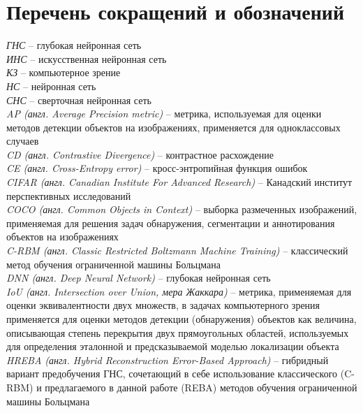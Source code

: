 \chapter*{Перечень сокращений и обозначений}

\noindent\textit{ГНС} -- глубокая нейронная сеть\\
\textit{ИНС} -- искусственная нейронная сеть\\
\textit{КЗ} -- компьютерное зрение\\
\textit{НС} -- нейронная сеть\\
\textit{СНС} -- сверточная нейронная сеть\\
\textit{AP (англ. Average Precision metric)} -- метрика, используемая для оценки методов детекции объектов на изображениях, применяется для одноклассовых случаев\\
\textit{CD (англ. Contrastive Divergence)} -- контрастное расхождение\\
\textit{CE (англ. Cross-Entropy error)} -- кросс-энтропийная функция ошибок\\
\textit{CIFAR (англ. Canadian Institute For Advanced Research)} -- Канадский институт перспективных исследований\\
\textit{COCO (англ. Common Objects in Context)} -- выборка размеченных изображений, применяемая для решения задач обнаружения, сегментации и аннотирования объектов на изображениях\\
\textit{C-RBM (англ. Classic Restricted Boltzmann Machine Training)} -- классический метод обучения ограниченной машины Больцмана\\
\textit{DNN (англ. Deep Neural Network)} -- глубокая нейронная сеть\\
\textit{IoU (англ. Intersection over Union, мера Жаккара)} -- метрика, применяемая для оценки эквивалентности двух множеств, в задачах компьютерного зрения применяется для оценки методов детекции (обнаружения) объектов как величина, описывающая степень перекрытия двух прямоугольных областей, используемых для определения эталонной и предсказываемой моделью локализации объекта \\
\textit{HREBA (англ. Hybrid Reconstruction Error-Based Approach)} -- гибридный вариант предобучения ГНС, сочетающий в себе использование классического (C-RBM) и предлагаемого в данной работе (REBA) методов обучения ограниченной машины Больцмана\\
